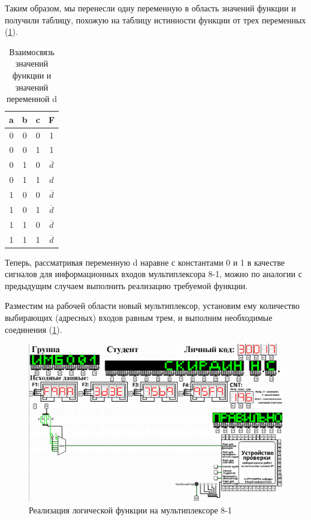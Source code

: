 \documentclass[14pt, a4paper]{extreport}
\begin{document}
Таким образом, мы перенесли одну переменную в область значений функции и получили таблицу, похожую на таблицу истинности функции от трех переменных (\cref{tab:f-and-d-relation}).

\begin{table}[!htbp]
	\caption{Взаимосвязь значений функции и значений переменной d}
	\label{tab:f-and-d-relation}
	\begin{tabular}{|c|c|c|c|}
		\hline
		a & b & c & F \\
		\hline
		0 & 0 & 0 & 1 \\
		\hline
		0 & 0 & 1 & 1 \\
		\hline
		0 & 1 & 0 & $\overline{d}$ \\
		\hline
		0 & 1 & 1 & $d$ \\
		\hline
		1 & 0 & 0 & $\overline{d}$ \\
		\hline
		1 & 0 & 1 & $\overline{d}$ \\
		\hline
		1 & 1 & 0 & $\overline{d}$ \\
		\hline
		1 & 1 & 1 & $\overline{d}$ \\
		\hline
	\end{tabular}
\end{table}

Теперь, рассматривая переменную d наравне с константами 0 и 1 в качестве сигналов для информационных входов мультиплексора 8-1, можно по аналогии с предыдущим случаем выполнить реализацию требуемой функции.

Разместим на рабочей области новый мультиплексор, установим ему количество выбирающих (адресных) входов равным трем, и выполним необходимые соединения (\cref{fig:multiplexer-8-1}).

\begin{figure}[H]
	\caption{Реализация логической функции на мультиплексоре 8-1}
	\label{fig:multiplexer-8-1}
	\includegraphics[width=\textwidth]{multiplexer-8-1}
\end{figure}
\end{document}
